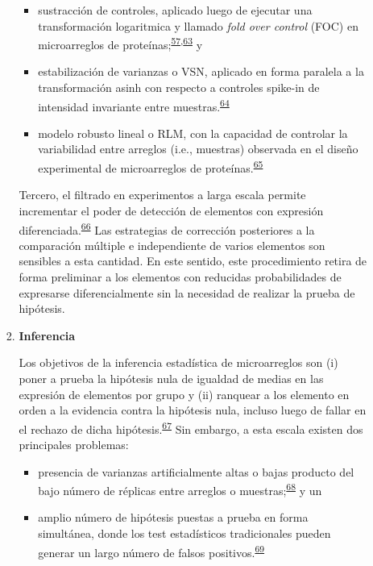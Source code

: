 \documentclass[]{article}
\providecommand{\tightlist}{%
  \setlength{\itemsep}{0pt}\setlength{\parskip}{0pt}}
\begin{document}
\begin{enumerate}
\begin{enumerate}
\begin{enumerate}
      \begin{itemize}
      \tightlist
      \item
        sustracción de controles, aplicado luego de ejecutar una
        transformación logaritmica y llamado \emph{fold over control}
        (FOC) en microarreglos de
        proteínas;\textsuperscript{\protect\hyperlink{ref-King2015FOC}{57},\protect\hyperlink{ref-arevalo2016}{63}}
        y
      \item
        estabilización de varianzas o VSN, aplicado en forma paralela a
        la transformación asinh con respecto a controles spike-in de
        intensidad invariante entre
        muestras.\textsuperscript{\protect\hyperlink{ref-huber2002vsn}{64}}
      \item
        modelo robusto lineal o RLM, con la capacidad de controlar la
        variabilidad entre arreglos (i.e., muestras) observada en el
        diseño experimental de microarreglos de
        proteínas.\textsuperscript{\protect\hyperlink{ref-sboner2009rlm}{65}}
      \end{itemize}

      Tercero, el filtrado en experimentos a larga escala permite
      incrementar el poder de detección de elementos con expresión
      diferenciada.\textsuperscript{\protect\hyperlink{ref-bourgon2010filter}{66}}
      Las estrategias de corrección posteriores a la comparación
      múltiple e independiente de varios elementos son sensibles a esta
      cantidad. En este sentido, este procedimiento retira de forma
      preliminar a los elementos con reducidas probabilidades de
      expresarse diferencialmente sin la necesidad de realizar la prueba
      de hipótesis.
    \item
      \textbf{Inferencia}

      Los objetivos de la inferencia estadística de microarreglos son
      (i) poner a prueba la hipótesis nula de igualdad de medias en las
      expresión de elementos por grupo y (ii) ranquear a los elemento en
      orden a la evidencia contra la hipótesis nula, incluso luego de
      fallar en el rechazo de dicha
      hipótesis.\textsuperscript{\protect\hyperlink{ref-smyth2004ebayes}{67}}
      Sin embargo, a esta escala existen dos principales problemas:

      \begin{itemize}
      \tightlist
      \item
        presencia de varianzas artificialmente altas o bajas producto
        del bajo número de réplicas entre arreglos o
        muestras;\textsuperscript{\protect\hyperlink{ref-baldi2001cybert}{68}}
        y un
      \item
        amplio número de hipótesis puestas a prueba en forma simultánea,
        donde los test estadísticos tradicionales pueden generar un
        largo número de falsos
        positivos.\textsuperscript{\protect\hyperlink{ref-kayala2012cyber}{69}}
      \end{itemize}


\end{enumerate}
\end{enumerate}
\end{enumerate}
\end{document}
